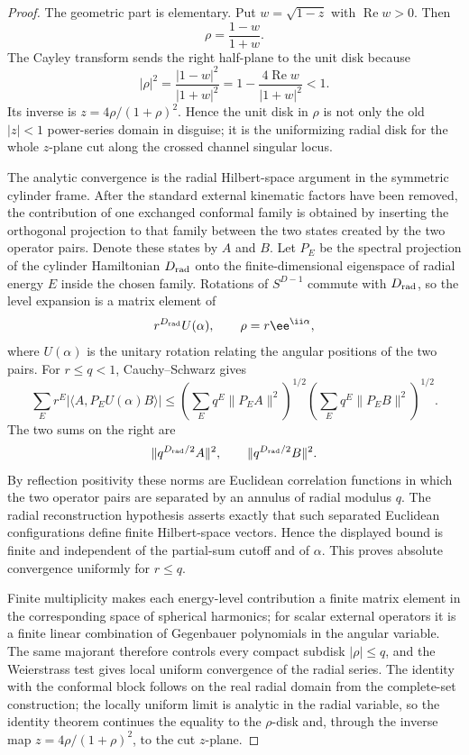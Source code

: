 \begin{proof}
The geometric part is elementary.  Put \(w=\sqrt{1-z}\) with
\(\operatorname{Re}w>0\).  Then
\[
  \rho=\frac{1-w}{1+w}.
\]
The Cayley transform sends the right half-plane to the unit disk because
\[
  |\rho|^2
  =
  \frac{|1-w|^2}{|1+w|^2}
  =
  1-\frac{4\operatorname{Re}w}{|1+w|^2}<1 .
\]
Its inverse is \(z=4\rho/(1+\rho)^2\).  Hence the unit disk in \(\rho\) is not
only the old \(|z|<1\) power-series domain in disguise; it is the
uniformizing radial disk for the whole \(z\)-plane cut along the crossed
channel singular locus.

The analytic convergence is the radial Hilbert-space argument in the symmetric
cylinder frame.  After the standard external kinematic factors have been
removed, the contribution of one exchanged conformal family is obtained by
inserting the orthogonal projection to that family between the two states
created by the two operator pairs.  Denote these states by \(A\) and \(B\).
Let \(P_E\) be the spectral projection of the cylinder Hamiltonian
\(D_{\rm rad}\) onto the finite-dimensional eigenspace of radial energy \(E\)
inside the chosen family.  Rotations of \(S^{D-1}\) commute with
\(D_{\rm rad}\), so the level expansion is a matrix element of
\[
  r^{D_{\rm rad}}U(\alpha),
  \qquad
  \rho=r\ee^{\ii\alpha},
\]
where \(U(\alpha)\) is the unitary rotation relating the angular positions of
the two pairs.  For \(r\le q<1\), Cauchy--Schwarz gives
\[
  \sum_E r^E
  \left|
    \langle A,P_EU(\alpha)B\rangle
  \right|
  \le
  \left(\sum_E q^E\|P_EA\|^2\right)^{1/2}
  \left(\sum_E q^E\|P_EB\|^2\right)^{1/2}.
\]
The two sums on the right are
\[
  \|q^{D_{\rm rad}/2}A\|^2,\qquad
  \|q^{D_{\rm rad}/2}B\|^2 .
\]
By reflection positivity these norms are Euclidean correlation functions in
which the two operator pairs are separated by an annulus of radial modulus
\(q\).  The radial reconstruction hypothesis asserts exactly that such
separated Euclidean configurations define finite Hilbert-space vectors.  Hence
the displayed bound is finite and independent of the partial-sum cutoff and of
\(\alpha\).  This proves absolute convergence uniformly for \(r\le q\).

Finite multiplicity makes each energy-level contribution a finite matrix
element in the corresponding space of spherical harmonics; for scalar external
operators it is a finite linear combination of Gegenbauer polynomials in the
angular variable.  The same majorant therefore controls every compact
subdisk \(|\rho|\le q\), and the Weierstrass test gives local uniform
convergence of the radial series.  The identity with the conformal block
follows on the real radial domain from the complete-set construction; the
locally uniform limit is analytic in the radial variable, so the identity
theorem continues the equality to the \(\rho\)-disk and, through the inverse
map \(z=4\rho/(1+\rho)^2\), to the cut \(z\)-plane.
\end{proof}

